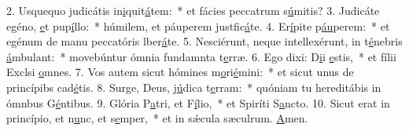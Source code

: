 2. Usquequo judicátis in\uline{i}quit\uline{á}tem:~* et fácies peccatrum s\uline{ú}mitis?
3. Judicáte egéno, \uline{e}t pup\uline{í}llo:~* húmilem, et páuperem justfic\uline{á}te.
4. Er\uline{í}pite p\uline{áu}perem:~* et egénum de manu peccatóris lber\uline{á}te.
5. Nesciérunt, neque intellexérunt, in t\uline{é}nebris \uline{á}mbulant:~* movebúntur ómnia fundamnta t\uline{e}rræ.
6. Ego dixi: D\uline{i}i \uline{e}stis,~* et fílii Exclsi \uline{o}mnes.
7. Vos autem sicut hómines m\uline{o}ri\uline{é}mini:~* et sicut unus de princípibs cad\uline{é}tis.
8. Surge, Deus, j\uline{ú}dica t\uline{e}rram:~* quóniam tu hereditábis in ómnbus G\uline{é}ntibus.
9. Glória P\uline{a}tri, et F\uline{í}lio,~* et Spiríti S\uline{a}ncto.
10. Sicut erat in princípio, et n\uline{u}nc, et s\uline{e}mper,~* et in sǽcula sæculrum. \uline{A}men.
